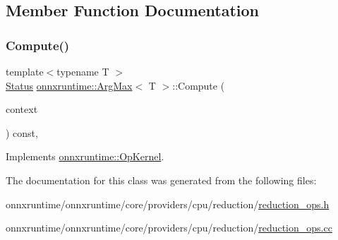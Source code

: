 \subsection{Member Function Documentation}
\mbox{\label{classonnxruntime_1_1ArgMax_a95bd6bd0ac4edacd65b56d623048e3b8}} 
\subsubsection{\texorpdfstring{Compute()}{Compute()}}
{\footnotesize\ttfamily template$<$typename T $>$ \\
\mbox{\hyperlink{classonnxruntime_1_1common_1_1Status}{Status}} \mbox{\hyperlink{classonnxruntime_1_1ArgMax}{onnxruntime\+::\+Arg\+Max}}$<$ T $>$\+::Compute (\begin{DoxyParamCaption}\item[{\mbox{\hyperlink{classonnxruntime_1_1OpKernelContext}{Op\+Kernel\+Context}} $\ast$}]{context }\end{DoxyParamCaption}) const\hspace{0.3cm}{\ttfamily [override]}, {\ttfamily [virtual]}}



Implements \mbox{\hyperlink{classonnxruntime_1_1OpKernel_a9eca8656a78b1b3ab9d3351a12798650}{onnxruntime\+::\+Op\+Kernel}}.



The documentation for this class was generated from the following files\+:\begin{DoxyCompactItemize}
\item 
onnxruntime/onnxruntime/core/providers/cpu/reduction/\mbox{\hyperlink{cpu_2reduction_2reduction__ops_8h}{reduction\+\_\+ops.\+h}}\item 
onnxruntime/onnxruntime/core/providers/cpu/reduction/\mbox{\hyperlink{cpu_2reduction_2reduction__ops_8cc}{reduction\+\_\+ops.\+cc}}\end{DoxyCompactItemize}
